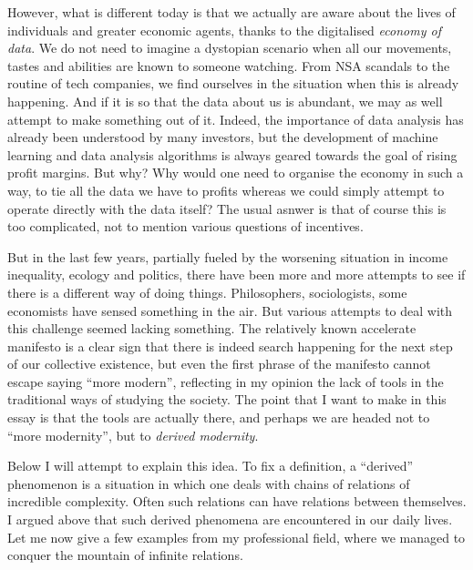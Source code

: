 \documentclass{article}
\begin{document}
However, what is different today is that we actually are aware about the lives of individuals and
greater economic agents, thanks to the digitalised \emph{economy of data}. We do not need to imagine
a dystopian scenario when all our movements, tastes and abilities are known to someone watching. From
NSA scandals to the routine of tech companies, we find ourselves in the situation when this is already
happening. And if it is so that the data about us is abundant, we may as well attempt to make something
out of it. Indeed, the importance of data analysis has already
been understood by many investors, but the development of machine learning and data analysis algorithms
is always geared towards the goal of rising profit margins. But why? Why would one need to
organise the economy in such a way, to tie all the data we have to profits whereas we
could simply attempt to operate directly with the data itself? The usual asnwer is that
of course this is too complicated, not to mention various questions of incentives.

But in the last few years, partially fueled by the worsening situation in income inequality, ecology and politics,
there have been more and more attempts to see if there is a different way of doing things.
Philosophers, sociologists, some economists have sensed something in the air.
But various attempts to deal with this challenge seemed lacking something. The relatively known accelerate manifesto \cite{SRNICEK} is a clear sign that there is indeed search happening for the next step of our collective existence, but even the first phrase of the manifesto cannot escape saying “more modern”, reflecting in my opinion the lack of tools in the traditional ways of studying the society. The point that I want to make in this essay is that the tools are actually there, and perhaps we are headed not to ``more modernity'', but to \emph{derived modernity}.

Below I will attempt to explain this idea. To fix a definition, a “derived” phenomenon is a situation in which one deals with chains of relations of incredible complexity. Often such
relations can have relations between themselves. I argued above that such derived phenomena
are encountered in our daily lives. Let me now give a few examples from my
professional field, where we managed to conquer the mountain of infinite relations.
\end{document}
